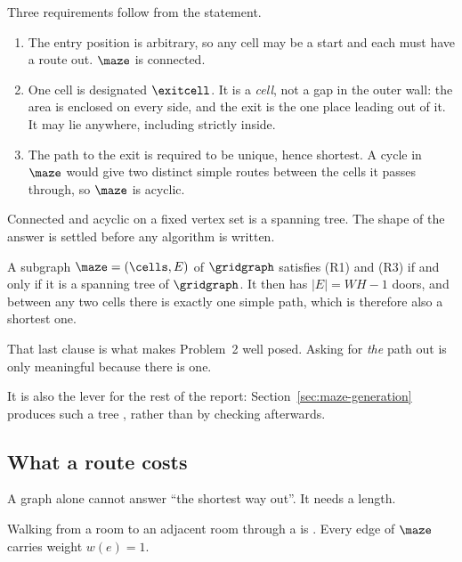 Three requirements follow from the statement.

\begin{enumerate}[label=(R\arabic*),leftmargin=*,itemsep=4pt]
  \item {} The entry position is arbitrary,
        so any cell may be a start and each must have a route out. $\maze$ is
        connected.
  \item {} One cell is designated
        $\exitcell$. It is a \emph{cell}, not a gap in the outer wall: the area
        is enclosed on every side, and the exit is the one place leading out of
        it. It may lie anywhere, including strictly inside.
  \item {} The path to the exit is required
        to be unique, hence shortest. A cycle in $\maze$ would give two distinct
        simple routes between the cells it passes through, so $\maze$ is
        acyclic.
\end{enumerate}

Connected and acyclic on a fixed vertex set is a spanning tree. The shape of the
answer is settled before any algorithm is written.

\begin{proposition}
\label{prop:spanning-tree}
A subgraph $\maze=(\cells,E)$ of $\gridgraph$ satisfies \textup{(R1)} and
\textup{(R3)} if and only if it is a spanning tree of $\gridgraph$. It then has
$|E|=WH-1$ doors, and between any two cells there is exactly one simple path,
which is therefore also a shortest one.
\end{proposition}

That last clause is what makes Problem~2 well posed. Asking for \emph{the} path
out is only meaningful because there is one.

It is also the lever for the rest of the report:
Section~\ref{sec:maze-generation} produces such a tree , rather than by checking afterwards.

\subsection{What a route costs}
\label{sec:unit-edge-weights}

A graph alone cannot answer ``the shortest way out''. It needs a length.

\begin{keypoint}
Walking from a room to an adjacent room through a  is
. Every edge of $\maze$ carries weight $w(e)=1$.
\end{keypoint}

